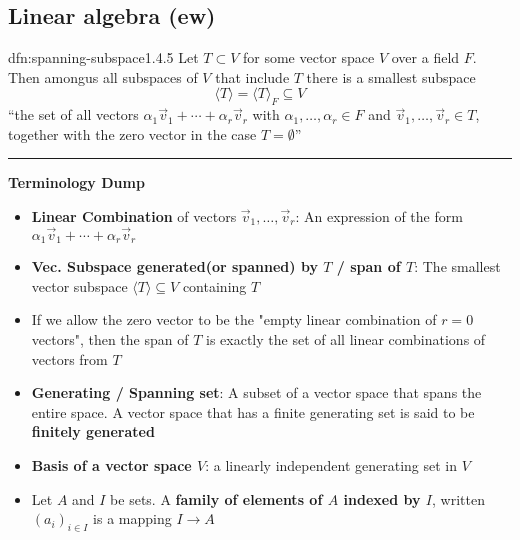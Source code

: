 \documentclass[landscape, 8pt]{extarticle}
\begin{document}
\begin{multicols}{3}
\section{Linear algebra (ew)}


\begin{dfn}{dfn:spanning-subspace}{1.4.5}
    Let $T \subset V$ for some vector space $V$ over a field $F$. Then amongus all subspaces of $V$ that include $T$ there is a smallest subspace
    \[\langle T \rangle = \langle T \rangle_{F} \subseteq V\]
    ``the set of all vectors $\alpha_{1}\vec{v}_{1} + \cdots + \alpha_{r}\vec{v}_{r}$ with $\alpha_{1},\dots,\alpha_{r}\in F$ and $\vec{v}_{1},\dots,\vec{v}_{r}\in T$, together with the zero vector in the case $T = \emptyset$''


    \noindent\rule{\textwidth}{0.2pt}

    \textbf{Terminology Dump}
    \begin{itemize}
        \setlength\itemsep{0em}
        \item \textbf{Linear Combination} of vectors $\vec{v}_{1},\dots,\vec{v}_{r}$: An expression of the form $\alpha_{1}\vec{v}_{1}+\cdots+\alpha_{r}\vec{v}_{r}$
        \item \textbf{Vec. Subspace generated(or spanned) by $T$ / span of $T$}: The smallest vector subspace $\langle T \rangle \subseteq V$ containing $T$
        \item If we allow the zero vector to be the "empty linear combination of $r = 0$ vectors", then the span of $T$ is exactly the set of all linear combinations of vectors from $T$ 
        \item[\textbf{1.4.7}:] \textbf{Generating / Spanning set}: A subset of a vector space that spans the entire space. A vector space that has a finite generating set is said to be \textbf{finitely generated}
        \item[\textbf{1.5.8}:] \textbf{Basis of a vector space $V$}: a linearly independent generating set in $V$
        \item[\textbf{1.5.9}:] Let $A$ and $I$ be sets. A \textbf{family of elements of $A$ indexed by $I$}, written $(a_{i})_{i\in I}$ is a mapping $I\to A$
    \end{itemize}
    

\end{dfn}
\end{multicols}
\end{document}
